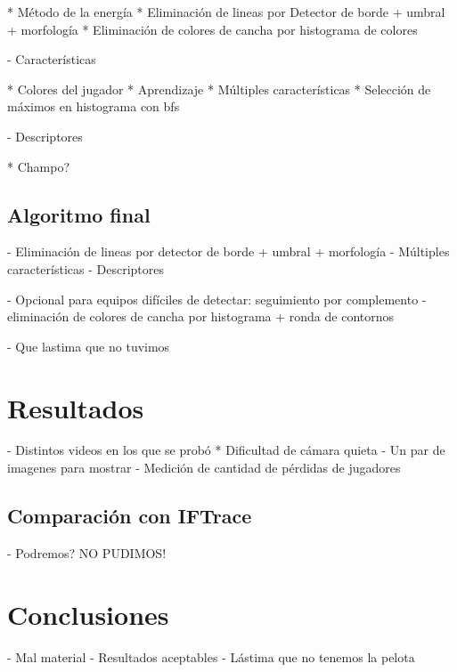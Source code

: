 \documentclass[a4paper,10pt]{article}
\begin{document}
  * Método de la energía
  * Eliminación de lineas por Detector de borde + umbral + morfología
  * Eliminación de colores de cancha por histograma de colores

- Características

  * Colores del jugador
  * Aprendizaje
  * Múltiples características
  * Selección de máximos en histograma con bfs

- Descriptores

  * Champo?

\subsection{Algoritmo final}

- Eliminación de lineas por detector de borde + umbral + morfología
- Múltiples características
- Descriptores

- Opcional para equipos difíciles de detectar: seguimiento por complemento
  - eliminación de colores de cancha por histograma + ronda de contornos

- Que lastima que no tuvimos 

\section{Resultados}

- Distintos videos en los que se probó
  * Dificultad de cámara quieta
- Un par de imagenes para mostrar
- Medición de cantidad de pérdidas de jugadores

\subsection{Comparación con IFTrace}

- Podremos? NO PUDIMOS!

\section{Conclusiones}

- Mal material
- Resultados aceptables
- Lástima que no tenemos la pelota
\end{document}
